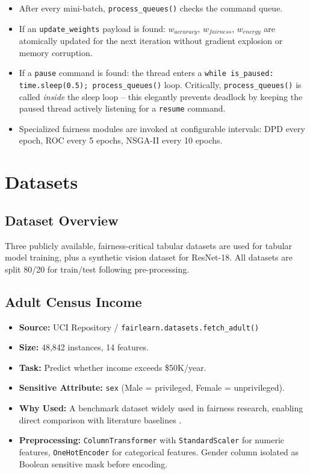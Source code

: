 \documentclass[12pt,a4paper]{article}
\begin{document}
\begin{itemize}
    \item After every mini-batch, \texttt{process\_queues()} checks the command queue.
    \item If an \texttt{update\_weights} payload is found: $w_{accuracy}$, $w_{fairness}$, $w_{energy}$ are atomically updated for the next iteration without gradient explosion or memory corruption.
    \item If a \texttt{pause} command is found: the thread enters a \texttt{while is\_paused: time.sleep(0.5); process\_queues()} loop. Critically, \texttt{process\_queues()} is called \textit{inside} the sleep loop -- this elegantly prevents deadlock by keeping the paused thread actively listening for a \texttt{resume} command.
    \item Specialized fairness modules are invoked at configurable intervals: DPD every epoch, ROC every 5 epochs, NSGA-II every 10 epochs.
\end{itemize}

\section{Datasets}

\subsection{Dataset Overview}

Three publicly available, fairness-critical tabular datasets are used for tabular model training, plus a synthetic vision dataset for ResNet-18. All datasets are split 80/20 for train/test following pre-processing.

\subsection{Adult Census Income}

\begin{itemize}
    \item \textbf{Source:} UCI Repository / \texttt{fairlearn.datasets.fetch\_adult()}
    \item \textbf{Size:} 48,842 instances, 14 features.
    \item \textbf{Task:} Predict whether income exceeds \$50K/year.
    \item \textbf{Sensitive Attribute:} \texttt{sex} (Male = privileged, Female = unprivileged).
    \item \textbf{Why Used:} A benchmark dataset widely used in fairness research, enabling direct comparison with literature baselines \cite{rN2024multiobj}.
    \item \textbf{Preprocessing:} \texttt{ColumnTransformer} with \texttt{StandardScaler} for numeric features, \texttt{OneHotEncoder} for categorical features. Gender column isolated as Boolean sensitive mask before encoding.
\end{itemize}
\end{document}
